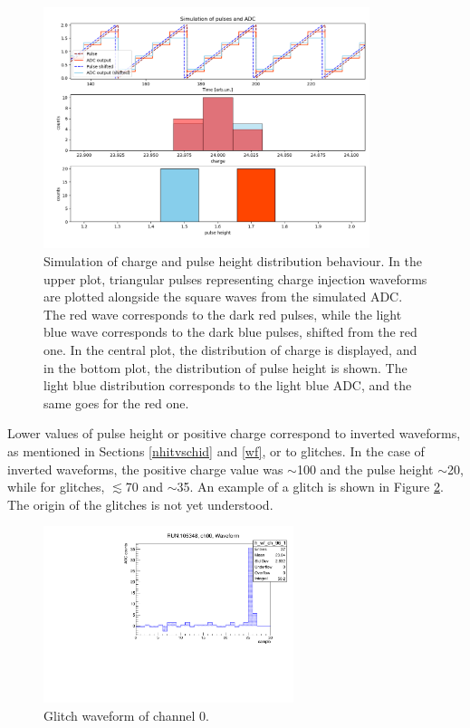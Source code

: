 \begin{figure}[!h]
  \centering
  \includegraphics[width=0.85\textwidth]{figures/png/pres.png}
  \caption[A simulation of charge and pulse height distribution behaviour.]{Simulation of charge and pulse height distribution behaviour. 
  In the upper plot, triangular pulses representing charge injection waveforms are 
  plotted alongside the square waves from the simulated ADC. The red wave corresponds to the dark red pulses, 
  while the light blue wave corresponds to the dark blue pulses, shifted from the red one. In the central plot, 
  the distribution of charge is displayed, and in the bottom plot, the distribution of pulse height is shown. 
  The light blue distribution corresponds to the light blue ADC, and the same goes for the red one.}
  \label{fig:simsim}
\end{figure}
Lower values of pulse height or positive charge correspond to 
inverted waveforms, as mentioned in Sections \ref{nhitvschid} 
and \ref{wf}, 
or to glitches. In the case of inverted waveforms, 
the positive charge value was $\sim$100 and the pulse height 
$\sim$20, while for glitches, $\lesssim$70 and $\sim$35. 
An example of a glitch is shown in Figure 
\ref{fig:glitches}. The origin of the glitches 
is not yet understood.
\begin{figure}[!h]
  \centering
  \includegraphics[width=0.65\textwidth]{figures/pdf/glitch.pdf}
  \caption[Glitch waveform of channel 0.]{Glitch waveform of channel 0.}
  \label{fig:glitches}
\end{figure}
